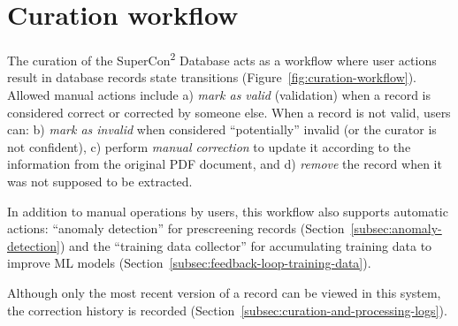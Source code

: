 \section{Curation workflow}
\label{sec:curation-workflow}
The curation of the SuperCon\textsuperscript{2} Database acts as a workflow where user actions result in database records state transitions (Figure~\ref{fig:curation-workflow}). 
Allowed manual actions include a) \textit{mark as valid} (validation) when a record is considered correct or corrected by someone else. When a record is not valid, users can: b) \textit{mark as invalid} when considered ``potentially'' invalid (or the curator is not confident), c) perform \textit{manual correction} to update it according to the information from the original PDF document, and d) \textit{remove} the record when it was not supposed to be extracted.

In addition to manual operations by users, this workflow also supports automatic actions: ``anomaly detection'' for prescreening records (Section~\ref{subsec:anomaly-detection}) and the ``training data collector'' for accumulating training data to improve ML models (Section~\ref{subsec:feedback-loop-training-data}). 


Although only the most recent version of a record can be viewed in this system, the correction history is recorded (Section~\ref{subsec:curation-and-processing-logs}). 



